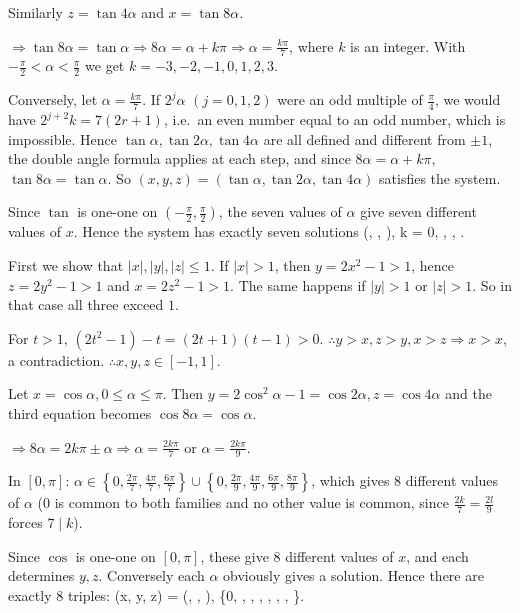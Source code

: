   Similarly $z = \tan4\alpha$ and $x = \tan8\alpha$.

  $\Rightarrow\tan8\alpha = \tan\alpha\Rightarrow 8\alpha = \alpha + k\pi\Rightarrow\alpha = \frac{k\pi}{7}$,
  where $k$ is an integer. With $-\frac{\pi}{2} < \alpha < \frac{\pi}{2}$ we get $k = -3, -2, -1, 0, 1, 2, 3$.

  Conversely, let $\alpha = \frac{k\pi}{7}$. If $2^j\alpha$ $(j = 0, 1, 2)$ were an odd multiple of
  $\frac{\pi}{4}$, we would have $2^{j + 2}k = 7(2r + 1)$, i.e.\ an even number equal to an odd number, which is
  impossible. Hence $\tan\alpha, \tan2\alpha, \tan4\alpha$ are all defined and different from $\pm1$, the
  double angle formula applies at each step, and since $8\alpha = \alpha + k\pi$, $\tan8\alpha = \tan\alpha$.
  So $(x, y, z) = (\tan\alpha, \tan2\alpha, \tan4\alpha)$ satisfies the system.

  Since $\tan$ is one-one on $\left(-\frac{\pi}{2}, \frac{\pi}{2}\right)$, the seven values of $\alpha$ give
  seven different values of $x$. Hence the system has exactly seven solutions
  \startformula
    \left(\tan{}, \tan{}, \tan{}\right), \quad k = 0, , , .
  \stopformula
\item First we show that $|x|, |y|, |z|\le 1$. If $|x| > 1$, then $y = 2x^2 - 1 > 1$, hence $z = 2y^2 - 1 > 1$
  and $x = 2z^2 - 1 > 1$. The same happens if $|y| > 1$ or $|z| > 1$. So in that case all three exceed $1$.

  For $t > 1$, $(2t^2 - 1) - t = (2t + 1)(t - 1) > 0$. $\therefore y > x, z > y, x > z\Rightarrow x > x$, a
  contradiction. $\therefore x, y, z\in[-1, 1]$.

  Let $x = \cos\alpha, 0\le\alpha\le\pi$. Then $y = 2\cos^2\alpha - 1 = \cos2\alpha, z = \cos4\alpha$ and the
  third equation becomes $\cos8\alpha = \cos\alpha$.

  $\Rightarrow 8\alpha = 2k\pi\pm\alpha\Rightarrow\alpha = \frac{2k\pi}{7}$ or $\alpha = \frac{2k\pi}{9}$.

  In $[0, \pi]$: $\alpha\in\left\{0, \frac{2\pi}{7}, \frac{4\pi}{7}, \frac{6\pi}{7}\right\}\cup\left\{0,
  \frac{2\pi}{9}, \frac{4\pi}{9}, \frac{6\pi}{9}, \frac{8\pi}{9}\right\}$, which gives $8$ different values of
  $\alpha$ ($0$ is common to both families and no other value is common, since $\frac{2k}{7} = \frac{2l}{9}$
  forces $7\mid k$).

  Since $\cos$ is one-one on $[0, \pi]$, these give $8$ different values of $x$, and each determines $y, z$.
  Conversely each $\alpha$ obviously gives a solution. Hence there are exactly $8$ triples:
  \startformula
    (x, y, z) = (\cos\alpha, \alpha, \alpha), \quad\alpha\in\left\{0, , , , , , , \right\}.
  \stopformula

